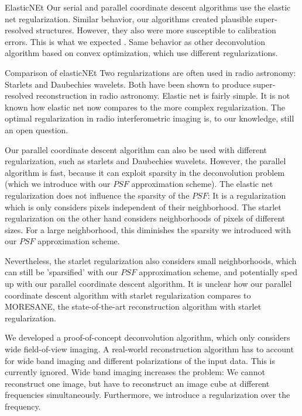 ElasticNEt
Our serial and parallel coordinate descent algorithms use the elastic net regularization.
Similar behavior, our algorithms created plausible super-resolved structures. However, they also were more susceptible to calibration errors.
This is what we expected \cite{offringa2017optimized}. Same behavior as other deconvolution algorithm based on convex optimization, which use different regularizations.

Comparison of elasticNEt
Two regularizations are often used in radio astronomy: Starlets \cite{starck2015starlet} and Daubechies wavelets\cite{carrillo2014purify}. Both have been shown to produce super-resolved reconstruction in radio astronomy\cite{dabbech2015moresane, dabbech2018cygnus}. Elastic net is fairly simple. It is not known how elastic net now compares to the more complex regularization.
The optimal regularization in radio interferometric imaging is, to our knowledge, still an open question. 

Our parallel coordinate descent algorithm can also be used with different regularization, such as starlets and Daubechies wavelets. However, the parallel algorithm is fast, because it can exploit sparsity in the deconvolution problem (which we introduce with our $PSF$ approximation scheme). The elastic net regularization does not influence the sparsity of the $PSF$: It is a regularization which is only considers pixels independent of their neighborhood. The starlet regularization on the other hand considers neighborhoods of pixels of different sizes. For a large neighborhood, this diminishes the sparsity we introduced with our $PSF$ approximation scheme.  

Nevertheless, the starlet regularization also considers small neighborhoods, which can still be 'sparsified' with our $PSF$ approximation scheme, and potentially sped up with our parallel coordinate descent algorithm. It is unclear how our parallel coordinate descent algorithm with starlet regularization compares to MORESANE, the state-of-the-art reconstruction algorithm with starlet regularization.

We developed a proof-of-concept deconvolution algorithm, which only considers wide field-of-view imaging. A real-world reconstruction algorithm has to account for wide band imaging and different polarizations of the input data. This is currently ignored. Wide band imaging increases the problem: We cannot reconstruct one image, but have to reconstruct an image cube at different frequencies simultaneously. Furthermore, we introduce a regularization over the frequency.

